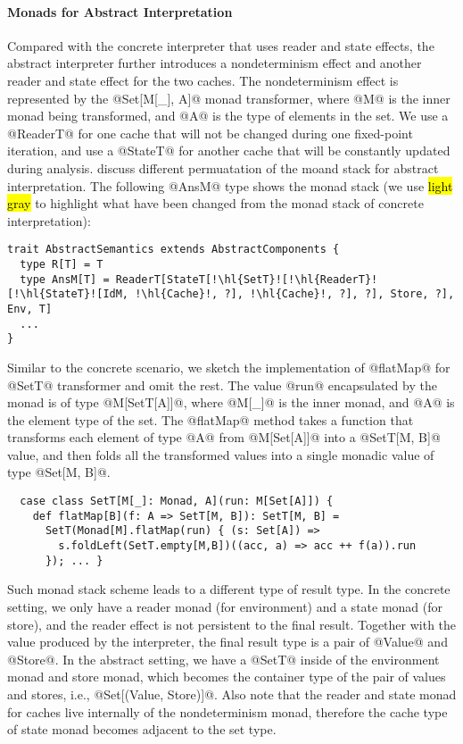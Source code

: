 \paragraph{Monads for Abstract Interpretation} Compared with the concrete
interpreter that uses reader and state effects, the abstract interpreter
further introduces a nondeterminism effect and another reader and state effect
for the two caches. The nondeterminism effect is represented by the
@Set[M[_], A]@ monad transformer, where @M@ is the inner monad being
transformed, and @A@ is the type of elements in the set. We use a @ReaderT@ for
one cache that will not be changed during one fixed-point iteration, and use a
@StateT@ for another cache that will be constantly updated during analysis.
\citet{DBLP:journals/pacmpl/DaraisLNH17} discuss different permuatation of the
moand stack for abstract interpretation. The following @AnsM@ type shows the
monad stack (we use \hl{light gray} to highlight what have been changed from
the monad stack of concrete interpretation):

\begin{lstlisting}[escapechar=!]
trait AbstractSemantics extends AbstractComponents {
  type R[T] = T
  type AnsM[T] = ReaderT[StateT[!\hl{SetT}![!\hl{ReaderT}![!\hl{StateT}![IdM, !\hl{Cache}!, ?], !\hl{Cache}!, ?], ?], Store, ?], Env, T]
  ...
}
\end{lstlisting}

Similar to the concrete scenario, we sketch the implementation of @flatMap@ for
@SetT@ transformer and omit the rest. The value @run@ encapsulated by the monad
is of type @M[SetT[A]]@, where @M[_]@ is the inner monad, and @A@ is the element
type of the set. The @flatMap@ method takes a function that transforms each
element of type @A@ from @M[Set[A]]@ into a @SetT[M, B]@ value, and then folds
all the transformed values into a single monadic value of type @Set[M, B]@.

\begin{lstlisting}
  case class SetT[M[_]: Monad, A](run: M[Set[A]]) {
    def flatMap[B](f: A => SetT[M, B]): SetT[M, B] =
      SetT(Monad[M].flatMap(run) { (s: Set[A]) =>
        s.foldLeft(SetT.empty[M,B])((acc, a) => acc ++ f(a)).run
      }); ... }
\end{lstlisting}

Such monad stack scheme leads to a different type of result type. In the concrete
setting, we only have a reader monad (for environment) and a state monad (for
store), and the reader effect is not persistent to the final result. Together
with the value produced by the interpreter, the final result type is a pair of
@Value@ and @Store@. In the abstract setting, we have a @SetT@ inside of the
environment monad and store monad, which becomes the container type of the pair
of values and stores, i.e., @Set[(Value, Store)]@. Also note that the reader and
state monad for caches live internally of the nondeterminism monad, therefore
the cache type of state monad becomes adjacent to the set type.

